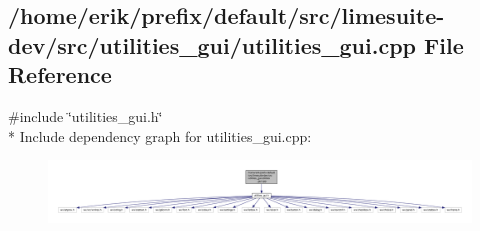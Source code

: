 \subsection{/home/erik/prefix/default/src/limesuite-\/dev/src/utilities\+\_\+gui/utilities\+\_\+gui.cpp File Reference}
\label{utilities__gui_8cpp}
{\ttfamily \#include \char`\"{}utilities\+\_\+gui.\+h\char`\"{}}\\*
Include dependency graph for utilities\+\_\+gui.\+cpp\+:
\nopagebreak
\begin{figure}[H]
\begin{center}
\leavevmode
\includegraphics[width=350pt]{d9/d98/utilities__gui_8cpp__incl}
\end{center}
\end{figure}
